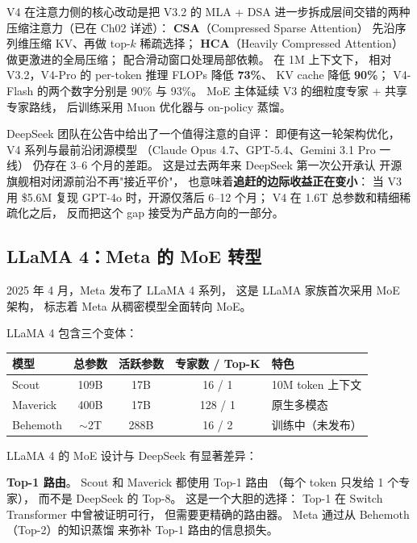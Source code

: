 V4 在注意力侧的核心改动是把 V3.2 的 MLA + DSA
进一步拆成层间交错的两种压缩注意力（已在 Ch02 详述）：
\textbf{CSA}（Compressed Sparse Attention）
先沿序列维压缩 KV、再做 top-$k$ 稀疏选择；
\textbf{HCA}（Heavily Compressed Attention）
做更激进的全局压缩；
配合滑动窗口处理局部依赖。
在 1M 上下文下，
相对 V3.2，V4-Pro 的 per-token 推理 FLOPs 降低 \textbf{73\%}、
KV cache 降低 \textbf{90\%}；
V4-Flash 的两个数字分别是 90\% 与 93\%。
MoE 主体延续 V3 的细粒度专家 + 共享专家路线，
后训练采用 Muon 优化器与 on-policy 蒸馏。

DeepSeek 团队在公告中给出了一个值得注意的自评：
即便有这一轮架构优化，
V4 系列与最前沿闭源模型
（Claude Opus 4.7、GPT-5.4、Gemini 3.1 Pro 一线）
仍存在 3--6 个月的差距。
这是过去两年来 DeepSeek 第一次公开承认
开源旗舰相对闭源前沿不再"接近平价"，
也意味着\textbf{追赶的边际收益正在变小}：
当 V3 用 \$5.6M 复现 GPT-4o 时，开源仅落后 6--12 个月；
V4 在 1.6T 总参数和精细稀疏化之后，
反而把这个 gap 接受为产品方向的一部分。

\subsection{LLaMA 4：Meta 的 MoE 转型}
\label{sec:llama4-moe}

2025 年 4 月，Meta 发布了 LLaMA 4 系列，%
这是 LLaMA 家族首次采用 MoE 架构，
标志着 Meta 从稠密模型全面转向 MoE。

LLaMA 4 包含三个变体：
\begin{center}\small
\renewcommand{\arraystretch}{1.3}
\begin{tabular}{lcccl}
  \toprule
  \rowcolor{figLightGray}
  \textbf{模型} & \textbf{总参数} & \textbf{活跃参数}
  & \textbf{专家数 / Top-K} & \textbf{特色} \\
  \midrule
  Scout & 109B & 17B & 16 / 1 & 10M token 上下文 \\
  Maverick & 400B & 17B & 128 / 1 & 原生多模态 \\
  Behemoth & $\sim$2T & 288B & 16 / 2 & 训练中（未发布） \\
  \bottomrule
\end{tabular}
\end{center}

LLaMA 4 的 MoE 设计与 DeepSeek 有显著差异：

\textbf{Top-1 路由}。
Scout 和 Maverick 都使用 Top-1 路由
（每个 token 只发给 1 个专家），
而不是 DeepSeek 的 Top-8。
这是一个大胆的选择：
Top-1 在 Switch Transformer 中曾被证明可行，
但需要更精确的路由器。
Meta 通过从 Behemoth（Top-2）的知识蒸馏
来弥补 Top-1 路由的信息损失。

